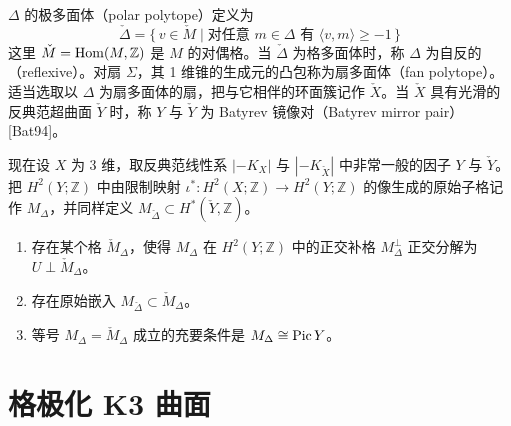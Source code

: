 

$\Delta$ 的极多面体（polar polytope）定义为
\begin{equation}
  \check{\Delta}=\{\,v\in\check{M}\mid\text{对任意 }m\in\Delta\text{ 有 }\langle v,m\rangle\ge -1\,\} \tag{3.3}
\end{equation}
这里 $\check{M}=\operatorname{Hom}(M,\mathbb{Z})$ 是 $M$ 的对偶格。当 $\check{\Delta}$ 为格多面体时，称 $\Delta$ 为自反的（reflexive）。对扇 $\Sigma$，其 1 维锥的生成元的凸包称为扇多面体（fan polytope）。适当选取以 $\Delta$ 为扇多面体的扇，把与它相伴的环面簇记作 $\check{X}$。当 $\check{X}$ 具有光滑的反典范超曲面 $\check{Y}$ 时，称 $Y$ 与 $\check{Y}$ 为 Batyrev 镜像对（Batyrev mirror pair）[Bat94]。

现在设 $X$ 为 3 维，取反典范线性系 $|-K_{X}|$ 与 $|-K_{\check{X}}|$ 中非常一般的因子 $Y$ 与 $\check{Y}$。把 $H^{2}(Y;\mathbb{Z})$ 中由限制映射 $\iota^{*}\colon H^{2}(X;\mathbb{Z})\to H^{2}(Y;\mathbb{Z})$ 的像生成的原始子格记作 $M_{\Delta}$，并同样定义 $M_{\check{\Delta}}\subset H^{*}(\check{Y},\mathbb{Z})$。

\begin{conjecture}\mbox{}\par
\begin{enumerate}[label=\arabic*.,leftmargin=2.2em]
  \item 存在某个格 $\check{M}_{\Delta}$，使得 $M_{\Delta}$ 在 $H^{2}(Y;\mathbb{Z})$ 中的正交补格 $M_{\Delta}^{\perp}$ 正交分解为 $U\perp\check{M}_{\Delta}$。
  \item 存在原始嵌入 $M_{\check{\Delta}}\subset\check{M}_{\Delta}$。
  \item 等号 $M_{\Delta}=\check{M}_{\Delta}$ 成立的充要条件是 $M_{\Delta}\cong\operatorname{Pic} Y$。
\end{enumerate}
\end{conjecture}


\section{格极化 K3 曲面}

